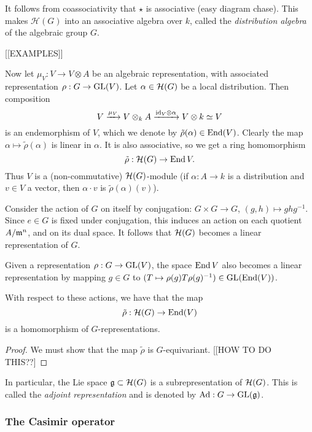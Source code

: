 \documentclass[11pt, english]{article}
\begin{document}
It follows from coassociativity that $\star$ is associative (easy diagram chase). This makes $\mathcal H(G)$ into an associative algebra over $k$, called the \emph{distribution algebra} of the algebraic group $G$. 

[[EXAMPLES]]

Now let $\mu_V: V \to V \otimes A$ be an algebraic representation, with associated representation $\rho:G \to \operatorname{GL}(V)$. Let $\alpha \in \mathcal{H}(G)$ be a local distribution. Then composition
\[
V \xrightarrow{\mu_V} V \otimes_k A \xrightarrow{\text{id}_V \otimes \alpha} V \otimes k \simeq V
\]
is an endemorphism of $V$, which we denote by $\tilde \rho(\alpha)\in \operatorname{End}(V)$. Clearly the map $\alpha \mapsto \tilde \rho (\alpha)$ is linear in $\alpha$. It is also associative, so we get a ring homomorphism
\begin{equation}
\label{tilde}
\tilde \rho: \mathcal{H}(G) \to \operatorname{End} V.
\end{equation}
Thus $V$ is a (non-commutative) $\mathcal{H}(G)$-module (if $\alpha:A \to k$ is a distribution and $v \in V$ a vector, then $\alpha \cdot v$ is $\tilde \rho(\alpha)(v)$).

Consider the action of $G$ on itself by conjugation: $G \times G \to G$, $(g,h) \mapsto  ghg^{-1}$. Since $e \in G$ is fixed under conjugation, this induces an action on each quotient $A/\mathfrak{m}^n$, and on its dual space. It follows that $\mathcal{H}(G)$ becomes a linear representation of $G$.

Given a representation $\rho:G \to \operatorname{GL}(V)$, the space $\operatorname{End} V$ also becomes a linear representation by mapping $g \in G$ to $(T \mapsto \rho(g) T \rho(g)^{-1}) \in \operatorname{GL}(\operatorname{End}(V))$. 

\begin{lemma}
\label{homog}
With respect to these actions, we have that the map
$$
\tilde \rho : \mathcal{H}(G) \to \operatorname{End}(V)
$$
is a homomorphism of $G$-representations.
\end{lemma}
\begin{proof}
We must show that the map $\tilde \rho$ is $G$-equivariant. [[HOW TO DO THIS??]
\end{proof}

In particular, the Lie space $\mathfrak g \subset \mathcal{H}(G)$ is a subrepresentation of $\mathcal{H}(G)$. This is called the \emph{adjoint representation} and is denoted by $\mathrm{Ad}:G \to \operatorname{GL}(\mathfrak g)$.


\subsubsection{The Casimir operator}
\end{document}
